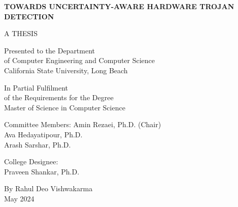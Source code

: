 \begin{titlepage}
    \doublespacing
    \begin{center}

       \uppercase{\textbf{Towards Uncertainty-Aware Hardware Trojan Detection}}
       
        \vspace{1.5cm}
        A THESIS
  
        Presented to the Department\\ of Computer Engineering and Computer Science\\
        California State University, Long Beach

        \vspace{1.5cm}

        In Partial Fulfilment \\ of the Requirements for the Degree \\
        Master of Science in Computer Science

        
        \vspace{1.5cm}
        Committee Members:
        \singlespacing
        Amin Rezaei, Ph.D. (Chair)
        \\Ava Hedayatipour, Ph.D.
        \\ Arash Sarshar, Ph.D.
       

        \vspace{1.5cm}
        \doublespacing
        College Designee:
        \\Praveen Shankar, Ph.D.

        \vfill
        By Rahul Deo Vishwakarma
        \\May 2024
    \end{center}
    
\end{titlepage}